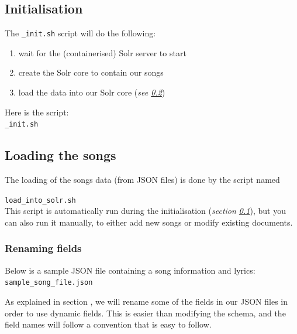 \bigskip


\subsection{Initialisation}  \label{initialisation}

The \texttt{\_init.sh} script will do the following:
\begin{enumerate}
	\item wait for the (containerised) Solr server to start
	\item create the Solr core to contain our songs
	\item load the data into our Solr core (\emph{see \ref{loading-songs}})
\end{enumerate}

\bigskip

Here is the script: \\

\texttt{\_init.sh}

\bigskip




\bigskip

\subsection{Loading the songs} \label{loading-songs}

The loading of the songs data (from JSON files) is done by the script named

\texttt{load\_into\_solr.sh} \\


This script is automatically run during the initialisation (\emph{section \ref{initialisation}}), but you can also run it manually, to either add new songs or modify existing documents. \\


\subsubsection{Renaming fields} \label{renaming-fields}

Below is a sample JSON file containing a song information and lyrics: \\

\texttt{sample\_song\_file.json}

\bigskip




As explained in section \emph{}, we will rename some of the fields in our JSON files in order to use dynamic fields. This is easier than modifying the schema, and the field names will follow a convention that is easy to follow. \\


